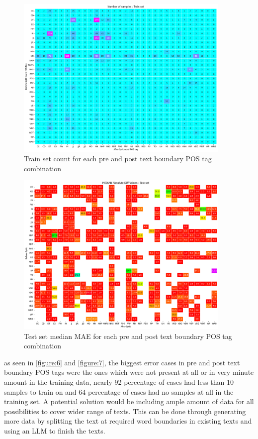 \documentclass[11pt]{article}
\begin{document}
\begin{figure}[!ht]
\centering
\includegraphics[width=0.922\textwidth]{plot-1.png}
\caption{Train set count for each pre and post text boundary POS tag combination}
\label{figure:6}
\end{figure}
\begin{figure}[!ht]
\centering
\includegraphics[width=0.922\textwidth]{Plot-8.png}
\caption{Test set median MAE for each pre and post text boundary POS tag combination}
\label{figure:7}
\end{figure}

as seen in \autoref{figure:6} and \autoref{figure:7}, the biggest error cases in pre and post text boundary POS tags were the ones which were not present at all or in very minute amount in the training data, nearly 92 percentage of cases had less than 10 samples to train on and 64 percentage of cases had no samples at all in the training set. A potential solution would be including ample amount of data for all possibilities to cover wider range of texts. This can be done through generating more data by splitting the text at required word boundaries in existing texts and using an LLM to finish the texts.
\end{document}
